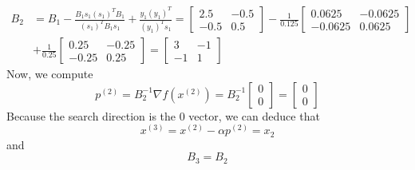 \documentclass[12pt]{article}
\begin{document}
\begin{align*}
B_2 &= B_1 - \frac{B_1 s_1 (s_1)^T B_1}{(s_1)^T B_1 s_1} + \frac{y_1 (y_1)^T}{(y_1)^T s_1} = 
 \begin{bmatrix}
2.5 & -0.5\\
-0.5 & 0.5
\end{bmatrix} - \frac{1}{0.125}\begin{bmatrix}
0.0625 & -0.0625\\
-0.0625 & 0.0625
\end{bmatrix} \\
& + \frac{1}{0.25} \begin{bmatrix}
0.25 & -0.25\\
-0.25 & 0.25
\end{bmatrix} =
\begin{bmatrix}
3 & -1\\
-1 & 1
\end{bmatrix}
\end{align*} Now, we compute
\[
p^{(2)} = B_2^{-1} \nabla f(x^{(2)}) = B_2^{-1} 
\begin{bmatrix}
0\\
0
\end{bmatrix} = \begin{bmatrix}
0\\
0
\end{bmatrix}
\] Because the search direction is the $0$ vector, we can deduce that
\[
x^{(3)} = x^{(2)} - \alpha p^{(2)} = x_2
\] and
\[
B_3 = B_2
\]
\end{document}
